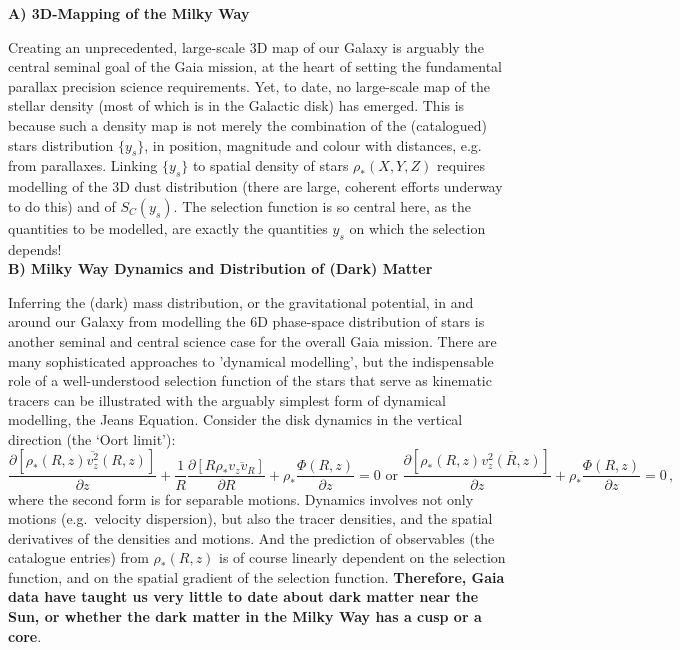 \noindent\textbf{A) 3D-Mapping of the Milky Way}

Creating an unprecedented, large-scale 3D map of our Galaxy is arguably the central seminal goal of the Gaia mission, at the heart of setting the fundamental parallax precision science requirements. Yet, to date, no large-scale map of the stellar density (most of which is in the Galactic disk) has emerged. This is because  such a density map is not merely the combination of the (catalogued) stars distribution $\{y_s\}$, in position, magnitude and colour with distances, e.g. from parallaxes. Linking $\{y_s\}$ to spatial density of stars $\rho_*(X,Y,Z)$ requires modelling of the 3D dust distribution (there are large, coherent efforts underway to do this) and of $S_C(y_s)$. The selection function is so central here, as the quantities to be modelled, are exactly the quantities $y_s$ on which the selection depends!
\\

\noindent\textbf{B) Milky Way Dynamics and Distribution of (Dark) Matter}

Inferring the (dark) mass distribution, or the gravitational potential, in and around our Galaxy from modelling the 6D phase-space distribution of stars is another seminal and central science case for the overall Gaia mission. There are many sophisticated approaches to 'dynamical modelling', but the indispensable role of a well-understood selection function of the stars that serve as kinematic tracers can be illustrated with the arguably simplest form of dynamical modelling, the Jeans Equation. Consider the disk dynamics in the vertical direction (the `Oort limit'):
\begin{equation}
    \frac{\partial[\rho_*(R,z) \overline{v_z^2}(R,z)]}{\partial z} + \frac{1}{R}
    \frac{\partial[R \rho_* \overline{v_z v_R}]}{\partial R} + \rho_*\frac{\Phi(R,z)}{\partial z}=0 \text{ or } \frac{\partial[\rho_*(R,z) \overline{v_z^2(R,z)}]}{\partial z} + \rho_*\frac{\Phi(R,z)}{\partial z}=0\,,
    \label{eqn:Jeans}
\end{equation}
where the second form is for separable motions. Dynamics involves not only motions (e.g.\ velocity dispersion), but also the tracer densities, and the spatial derivatives of the densities and motions. And the prediction of observables (the catalogue entries) from $\rho_*(R,z)$ is of course linearly dependent on the selection function, and on the spatial gradient of the selection function. \textbf{Therefore, Gaia data have taught us very little to date about dark matter near the Sun, or whether the dark matter in the Milky Way has a cusp or a core}.

